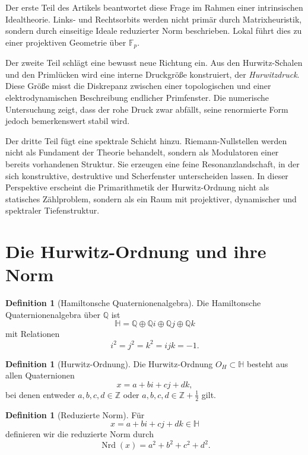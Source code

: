 \documentclass[a4paper,12pt]{article}
\theoremstyle{definition}
\newtheorem{definition}[satz]{Definition}
\numberwithin{equation}{section}
\newcommand{\OH}{O_H}
\newcommand{\HH}{\mathbb{H}}
\newcommand{\Q}{\mathbb{Q}}
\newcommand{\Z}{\mathbb{Z}}
\newcommand{\Fp}{\mathbb{F}_p}
\newcommand{\Nrd}{\operatorname{Nrd}}
\begin{document}
	Der erste Teil des Artikels beantwortet diese Frage im Rahmen einer intrinsischen Idealtheorie. Links- und Rechtsorbits werden nicht primär durch Matrixheuristik, sondern durch einseitige Ideale reduzierter Norm beschrieben. Lokal führt dies zu einer projektiven Geometrie über \(\Fp\).
	
	Der zweite Teil schlägt eine bewusst neue Richtung ein. Aus den Hurwitz-Schalen und den Primlücken wird eine interne Druckgröße konstruiert, der \emph{Hurwitzdruck}. Diese Größe misst die Diskrepanz zwischen einer topologischen und einer elektrodynamischen Beschreibung endlicher Primfenster. Die numerische Untersuchung zeigt, dass der rohe Druck zwar abfällt, seine renormierte Form jedoch bemerkenswert stabil wird.
	
	Der dritte Teil fügt eine spektrale Schicht hinzu. Riemann-Nullstellen werden nicht als Fundament der Theorie behandelt, sondern als Modulatoren einer bereits vorhandenen Struktur. Sie erzeugen eine feine Resonanzlandschaft, in der sich konstruktive, destruktive und Scherfenster unterscheiden lassen. In dieser Perspektive erscheint die Primarithmetik der Hurwitz-Ordnung nicht als statisches Zählproblem, sondern als ein Raum mit projektiver, dynamischer und spektraler Tiefenstruktur.
	
	\section{Die Hurwitz-Ordnung und ihre Norm}
	
	\begin{definition}[Hamiltonsche Quaternionenalgebra]
		Die Hamiltonsche Quaternionenalgebra über \(\Q\) ist
		\[
		\HH=\Q\oplus \Q i\oplus \Q j\oplus \Q k
		\]
		mit Relationen
		\[
		i^2=j^2=k^2=ijk=-1.
		\]
	\end{definition}
	
	\begin{definition}[Hurwitz-Ordnung]
		Die Hurwitz-Ordnung \(\OH\subset \HH\) besteht aus allen Quaternionen
		\[
		x=a+bi+cj+dk,
		\]
		bei denen entweder \(a,b,c,d\in \Z\) oder \(a,b,c,d\in \Z+\frac12\) gilt.
	\end{definition}
	
	\begin{definition}[Reduzierte Norm]
		Für
		\[
		x=a+bi+cj+dk\in \HH
		\]
		definieren wir die reduzierte Norm durch
		\[
		\Nrd(x)=a^2+b^2+c^2+d^2.
		\]
	\end{definition}
	
\end{document}
